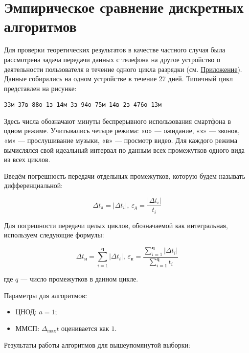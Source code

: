 \documentclass[12pt]{report}
\let\eps\varepsilon
\begin{document}
\section{Эмпирическое сравнение дискретных алгоритмов}

Для проверки теоретических результатов в качестве частного случая была рассмотрена задача передачи данных с телефона на другое устройство о деятельности пользователя в течение одного цикла разрядки (см. \hyperref[sec:attach]{Приложение}). Данные собирались на одном устройстве в течение 27 дней. Типичный цикл представлен на рисунке:
\label{sec:wait}

\begin{center}
\begin{BVerbatim}
33м 37в 88о 1з 14м 3з 94о 75м 14в 2з 476о 13м
\end{BVerbatim}
\end{center}

Здесь числа обозначают минуты беспрерывного использования смартфона в одном режиме. Учитывались четыре режима: «о» — ожидание, «з» — звонок, «м» — прослушивание музыки, «в» — просмотр видео. Для каждого режима вычислялся свой идеальный интервал по данным всех промежутков одного вида из всех циклов.

Введём погрешность передачи отдельных промежутков, которую будем называть дифференциальной:

$$\Delta t_{\text{д}} = |\Delta t_i|,\ \eps_{\text{д}} = \frac{|\Delta t_i|}{t_i}$$

Для погрешности передачи целых циклов, обозначаемой как интегральная, используем следующие формулы:

$$\Delta t_{\text{и}} = \sum_{i=1}^{\bm{q}} |\Delta t_i|,\ \eps_{\text{и}} = \frac{\sum_{i=1}^{\bm{q}} |\Delta t_i|}{\sum_{i=1}^{\bm{q}} t_i}$$

где $q$ — число промежутков в данном цикле.

Параметры для алгоритмов:
\begin{itemize}
    \item ЦНОД: $a = 1$;
    \item ММСП: $\Delta_{\max} t$ оценивается как $1$.
\end{itemize}


Результаты работы алгоритмов для вышеупомянутой выборки: 
\end{document}
